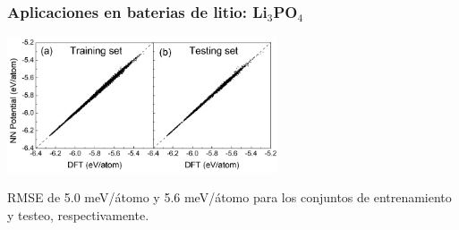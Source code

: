 \documentclass[aspectratio=169]{beamer}
\begin{document}
    \begin{frame}
        \frametitle{Aplicaciones en baterias de litio: Li$_3$PO$_4$}

        \begin{center}
            \includegraphics[width=0.6\textwidth]{Li3PO4-training_testing.png}
        \end{center}

        RMSE de 5.0 meV/átomo y 5.6 meV/átomo para los conjuntos de entrenamiento
        y testeo, respectivamente.

    \end{frame}
\end{document}
